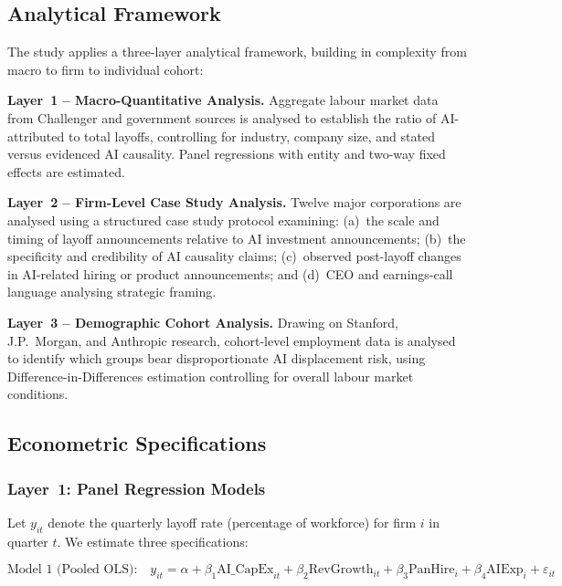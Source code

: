 \documentclass[12pt, a4paper]{article}
\begin{document}
\subsection{Analytical Framework}

The study applies a three-layer analytical framework, building in complexity from macro to
firm to individual cohort:

\textbf{Layer~1 -- Macro-Quantitative Analysis.} Aggregate labour market data from
Challenger and government sources is analysed to establish the ratio of AI-attributed to
total layoffs, controlling for industry, company size, and stated versus evidenced AI
causality. Panel regressions with entity and two-way fixed effects are estimated.

\textbf{Layer~2 -- Firm-Level Case Study Analysis.} Twelve major corporations are analysed
using a structured case study protocol examining: (a)~the scale and timing of layoff
announcements relative to AI investment announcements; (b)~the specificity and credibility
of AI causality claims; (c)~observed post-layoff changes in AI-related hiring or product
announcements; and (d)~CEO and earnings-call language analysing strategic framing.

\textbf{Layer~3 -- Demographic Cohort Analysis.} Drawing on Stanford, J.P.~Morgan, and
Anthropic research, cohort-level employment data is analysed to identify which groups bear
disproportionate AI displacement risk, using Difference-in-Differences estimation controlling
for overall labour market conditions.

\subsection{Econometric Specifications}

\subsubsection{Layer~1: Panel Regression Models}

Let $y_{it}$ denote the quarterly layoff rate (percentage of workforce) for firm $i$ in
quarter $t$. We estimate three specifications:

\begin{equation}
\text{Model 1 (Pooled OLS):}\quad
y_{it} = \alpha + \beta_1 \text{AI\_CapEx}_{it} + \beta_2 \text{RevGrowth}_{it}
       + \beta_3 \text{PanHire}_{i} + \beta_4 \text{AIExp}_{i} + \varepsilon_{it}
\label{eq:m1}
\end{equation}
\end{document}

